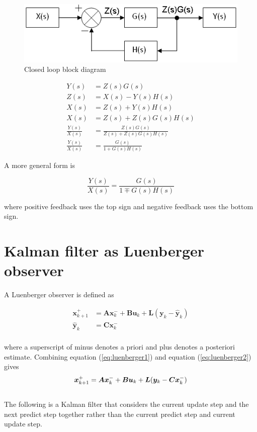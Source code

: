 \documentclass[10pt,conference,compsoc]{IEEEtran}
\newcommand{\mtx}[1] {\bm #1}
\begin{document}
\begin{figure}[H]
  \includegraphics[width=\linewidth]{figs/Closed_Loop_Block_Deriv.png}
  \caption{Closed loop block diagram \cite{bib:closed_loop_block_derivation}}
  \label{fig:closed_loop_deriv}
\end{figure}

\begin{align}
  Y(s) &= Z(s) G(s) \nonumber \\
  Z(s) &= X(s) - Y(s) H(s) \nonumber \\
  X(s) &= Z(s) + Y(s) H(s) \nonumber \\
  X(s) &= Z(s) + Z(s) G(s) H(s) \nonumber \\
  \frac{Y(s)}{X(s)} &= \frac{Z(s) G(s)}{Z(s) + Z(s) G(s) H(s)} \nonumber \\
  \frac{Y(s)}{X(s)} &= \frac{G(s)}{1 + G(s) H(s)}
\end{align}

\noindent A more general form is

\begin{equation}
  \frac{Y(s)}{X(s)} = \frac{G(s)}{1 \mp G(s) H(s)}
\end{equation}

\noindent where positive feedback uses the top sign and negative feedback uses
the bottom sign.

\section{Kalman filter as Luenberger observer} \label{sec:app_kalman_luenberger}

\noindent A Luenberger observer is defined as

\begin{align}
  \mtx{x}_{k+1}^+ &= \mtx{A} \mtx{x}_k^- + \mtx{B} \mtx{u}_k + \mtx{L}
    (\mtx{y}_k - \hat{\mtx{y}}_k) \label{eq:luenberger1} \\
  \hat{\mtx{y}}_k &= \mtx{C} \mtx{x}_k^- \label{eq:luenberger2} \\ \nonumber
\end{align}

\noindent where a superscript of minus denotes a priori and plus denotes a
posteriori estimate. Combining equation (\ref{eq:luenberger1}) and equation
(\ref{eq:luenberger2}) gives
\\
\begin{equation} \label{eq:luenberger}
  \mtx{x}_{k+1}^+ = \mtx{A} \mtx{x}_k^- + \mtx{B} \mtx{u}_k + \mtx{L}
    (\mtx{y}_k - \mtx{C} \mtx{x}_k^-) \\
\end{equation}
\\
\noindent The following is a Kalman filter that considers the current update
step and the next predict step together rather than the current predict step and
current update step.
\end{document}
